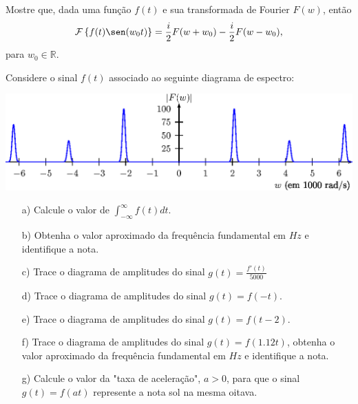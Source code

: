 \begin{exer}{\label{ex_mod_sin}}Mostre que, dada uma função $f(t)$ e sua transformada de Fourier $F(w)$, então
\begin{equation}
\mathcal{F}\left\{f(t)\sen(w_0t) \right\}=\frac{i}{2}F(w+w_0)-\frac{i}{2 }F(w-w_0),
\end{equation}
para $w_0\in\mathbb{R}$.
\end{exer}

\begin{exer} Considere o sinal $f(t)$ associado ao seguinte diagrama de espectro:
\begin{center}
\includegraphics{cap_propriedades_transformada/pics/figura_21}\end{center}
\begin{itemize}
\item[a)] Calcule o valor de $\int_{-\infty}^\infty f(t) dt$.
\item[b)] Obtenha o valor aproximado da frequência fundamental em $Hz$ e identifique a nota.
\item[c)] Trace o diagrama de amplitudes do sinal $g(t)=\frac{f'(t)}{5000}$
\item[d)] Trace o diagrama de amplitudes do sinal $g(t)=f(-t)$.
\item[e)] Trace o diagrama de amplitudes do sinal $g(t)=f(t-2)$.
\item[f)] Trace o diagrama de amplitudes do sinal $g(t)=f(1.12t)$, obtenha o valor aproximado da frequência fundamental em $Hz$ e identifique a nota.
\item[g)] Calcule o valor da "taxa de aceleração", $a>0$, para que o sinal $g(t)=f(at)$ represente a nota sol na mesma oitava.
\end{itemize}
\end{exer}
